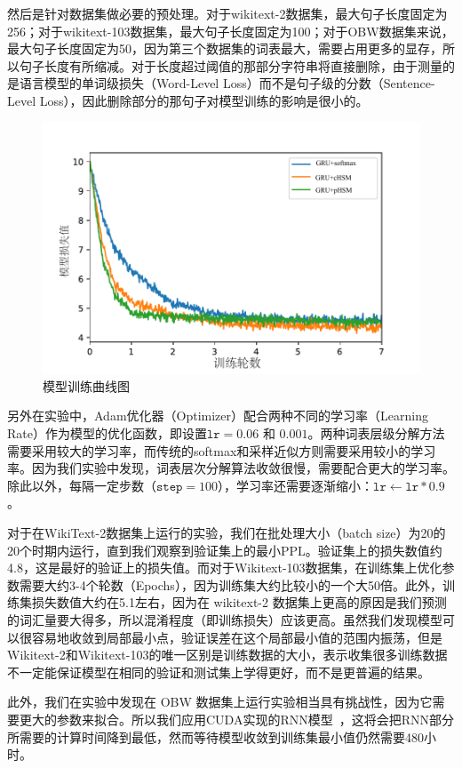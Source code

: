 然后是针对数据集做必要的预处理。对于wikitext-2数据集，最大句子长度固定为256；对于wikitext-103数据集，最大句子长度固定为100；对于OBW数据集来说，最大句子长度固定为50，因为第三个数据集的词表最大，需要占用更多的显存，所以句子长度有所缩减。对于长度超过阈值的那部分字符串将直接删除，由于测量的是语言模型的单词级损失（Word-Level Loss）而不是句子级的分数（Sentence-Level Loss），因此删除部分的那句子对模型训练的影响是很小的。
\begin{figure}[!ht]
  \centering
  \includegraphics[width=0.6\columnwidth]{./figures/learn2.pdf}
  \caption{模型训练曲线图}
\end{figure}

另外在实验中，Adam优化器（Optimizer）配合两种不同的学习率（Learning Rate）作为模型的优化函数，即设置$ \texttt{lr}  = 0.06$ 和 $0.001 $。两种词表层级分解方法需要采用较大的学习率，而传统的softmax和采样近似方则需要采用较小的学习率。因为我们实验中发现，词表层次分解算法收敛很慢，需要配合更大的学习率。除此以外，每隔一定步数（$\texttt{step} =100$），学习率还需要逐渐缩小：$\texttt{lr} \leftarrow \texttt{lr}  *0.9$。

对于在WikiText-2数据集上运行的实验，我们在批处理大小（batch size）为20的20个时期内运行，直到我们观察到验证集上的最小$ \mathrm{PPL} $。验证集上的损失数值约4.8，这是最好的验证上的损失值。而对于Wikitext-103数据集，在训练集上优化参数需要大约3-4个轮数（Epochs），因为训练集大约比较小的一个大50倍。此外，训练集损失数值大约在5.1左右，因为在 wikitext-2 数据集上更高的原因是我们预测的词汇量要大得多，所以混淆程度（即训练损失）应该更高。虽然我们发现模型可以很容易地收敛到局部最小点，验证误差在这个局部最小值的范围内振荡，但是Wikitext-2和Wikitext-103的唯一区别是训练数据的大小，表示收集很多训练数据不一定能保证模型在相同的验证和测试集上学得更好，而不是更普遍的结果。

此外，我们在实验中发现在 OBW 数据集上运行实验相当具有挑战性，因为它需要更大的参数来拟合。所以我们应用CUDA实现的RNN模型~，这将会把RNN部分所需要的计算时间降到最低，然而等待模型收敛到训练集最小值仍然需要480小时。

